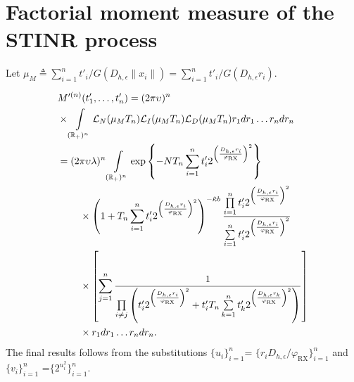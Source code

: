 \documentclass[lettersize,journal]{IEEEtran}
\newcommand{\R}{\mathbb{R}}
\begin{document}


\appendices

\section{Factorial moment measure of the STINR process}
\label{app:factorialmomentmeasureoftheSTINR}
Let $\mu_M \triangleq \sum_{i=1}^nt'_i/G(D_{h,\epsilon}\|x_i\|)=\sum_{i=1}^nt'_i/G(D_{h,\epsilon} r_i)$.

\begin{align}
  &M'^{(n)}(t'_1,\dots,t'_n) =(2 \pi \upsilon_{})^n\nonumber\\
  & \times\int\limits_{(\R_+)^n} \mathcal{L}_N(\mu_MT_n)\mathcal{L}_I(\mu_MT_n)\mathcal{L}_D(\mu_MT_n) r_1 dr_1 \dots r_n dr_n\nonumber \\
  &=(2 \pi \upsilon_{} \lambda)^n \int\limits_{(\R_+)^n} \exp\left\{-NT_n\sum\limits_{i=1}^nt'_i2^{\left(\frac{D_{h,\epsilon}r_i}{\varphi_{\text{RX}}}\right)^2}\right\} \nonumber\\
  &\hspace{0.8cm}\times\left(1+T_n\sum\limits_{i=1}^nt'_i2^{\left(\frac{D_{h,\epsilon}r_i}{\varphi_{\text{RX}}}\right)^2}\right)^{- \tilde{\kappa}b} \frac{\prod\limits_{i=1}^nt'_i2^{\left(\frac{D_{h,\epsilon}r_i}{\varphi_{\text{RX}}}\right)^2}}{\sum\limits_{i=1}^nt'_i2^{\left(\frac{D_{h,\epsilon}r_i}{\varphi_{\text{RX}}}\right)^2}} \nonumber\\
  &\hspace{0.8cm}\times  \left[\sum\limits_{j=1}^n\frac{1}{\prod\limits_{i\neq j}\left(t'_i 2^{\left(\frac{D_{h,\epsilon}r_i}{\varphi_{\text{RX}}}\right)^2}+ t_i'T_n\sum\limits_{k=1}^nt'_k2^{\left(\frac{D_{h,\epsilon}r_k}{\varphi_{\text{RX}}}\right)^2} \right)} \right] \nonumber\\
  &\hspace{0.8cm}\times r_1 dr_1 \dots r_n dr_n.
\end{align}
The final results follows from the substitutions $\{u_i\}_{i= 1}^n$= $\{r_i D_{h,\epsilon}/\varphi_{\text{RX}}\}_{i= 1}^n$ and $\{v_i\}_{i= 1}^n$ =$\{ 2^{u^2_i}\}_{i= 1}^n$.
\end{document}

